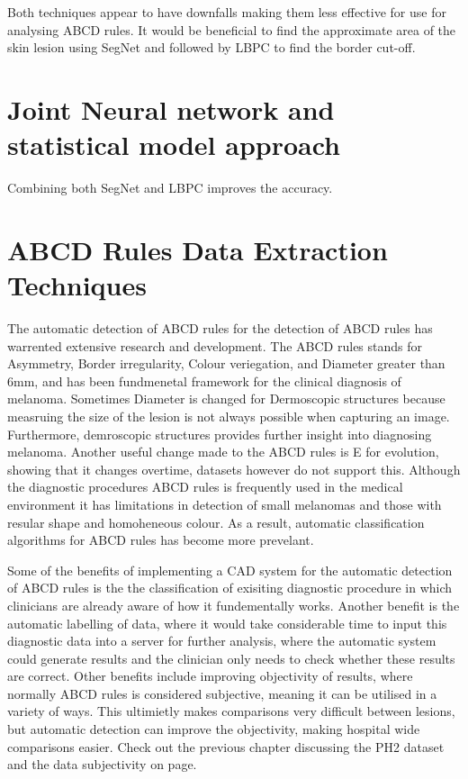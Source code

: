 Both techniques appear to have downfalls making them less effective for use for analysing ABCD rules. It would be beneficial to find the approximate area of the skin lesion using SegNet and followed by LBPC to find the border cut-off.

\section{Joint Neural network and statistical model approach}
Combining both SegNet and LBPC improves the accuracy.


















\section{ABCD Rules Data Extraction Techniques}
The automatic detection of ABCD rules for the detection of ABCD rules has warrented extensive research and development\cite{Ali2020}. The ABCD rules stands for Asymmetry, Border irregularity, Colour veriegation, and Diameter greater than 6mm, and has been fundmenetal framework for the clinical diagnosis of melanoma. Sometimes Diameter is changed for Dermoscopic structures because measruing the size of the lesion is not always possible when capturing an image. Furthermore, demroscopic structures provides further insight into diagnosing melanoma\cite{}. Another useful change made to the ABCD rules is E for evolution, showing that it changes overtime, datasets however do not support this. Although the diagnostic procedures ABCD rules is frequently used in the medical environment it has limitations in detection of small melanomas and those with resular shape and homoheneous colour\cite{Dermoscopy Improves Accuracy of Primary Care Physicians to Triage Lesions Suggestive of Skin Cancer}. As a result, automatic classification algorithms for ABCD rules has become more prevelant\cite{Kasmi2016}.

Some of the benefits of implementing a CAD system for the automatic detection of ABCD rules is the the classification of exisiting diagnostic procedure in which clinicians are already aware of how it fundementally works. Another benefit is the automatic labelling of data, where it would take considerable time to input this diagnostic data into a server for further analysis, where the automatic system could generate results and the clinician only needs to check whether these results are correct. Other benefits include improving objectivity of results, where normally ABCD rules is considered subjective, meaning it can be utilised in a variety of ways. This ultimietly makes comparisons very difficult between lesions, but automatic detection can improve the objectivity, making hospital wide comparisons easier. Check out the previous chapter discussing the PH2 dataset and the data subjectivity on page\pageref*{ph2-image-assessment}.


